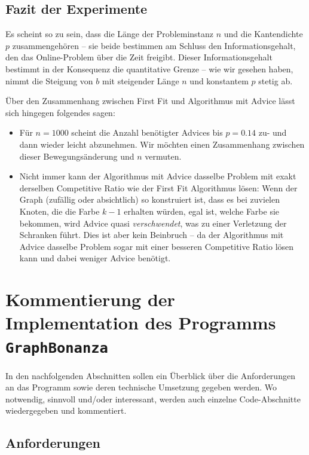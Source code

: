 \documentclass[11pt,abstracton]{scrreprt} %
\theoremstyle{definition}
\begin{document}
\section{Fazit der Experimente}

Es scheint so zu sein, dass die Länge der Probleminstanz $n$ und die Kantendichte $p$ zusammengehören -- sie beide bestimmen am Schluss den Informationsgehalt, den das Online-Problem über die Zeit freigibt. Dieser Informationsgehalt bestimmt in der Konsequenz die quantitative Grenze -- wie wir gesehen haben, nimmt die Steigung von $b$ mit steigender Länge $n$ und konstantem $p$ stetig ab.

\bigskip
Über den Zusammenhang zwischen First Fit und Algorithmus mit Advice lässt sich hingegen folgendes sagen:

\begin{itemize}
\item Für $n = 1000$ scheint die Anzahl benötigter Advices bis $p = 0.14$ zu- und dann wieder leicht abzunehmen. Wir möchten einen Zusammenhang zwischen dieser Bewegungsänderung und $n$ vermuten.
\item Nicht immer kann der Algorithmus mit Advice dasselbe Problem mit exakt derselben Competitive Ratio wie der First Fit Algorithmus lösen: Wenn der Graph (zufällig oder absichtlich) so konstruiert ist, dass es bei zuvielen Knoten, die die Farbe $k-1$ erhalten würden, egal ist, welche Farbe sie bekommen, wird Advice quasi {\sl verschwendet}, was zu einer Verletzung der Schranken führt. Dies ist aber kein Beinbruch --  da der Algorithmus mit Advice dasselbe Problem sogar mit einer besseren Competitive Ratio lösen kann und dabei weniger Advice benötigt.
\end{itemize}


\chapter{Kommentierung der Implementation des Programms {\tt GraphBonanza}}

In den nachfolgenden Abschnitten sollen ein Überblick über die Anforderungen an das Programm sowie deren technische Umsetzung gegeben werden. Wo notwendig, sinnvoll und/oder interessant, werden auch einzelne Code-Abschnitte wiedergegeben und kommentiert.

\section{Anforderungen}
\end{document}
